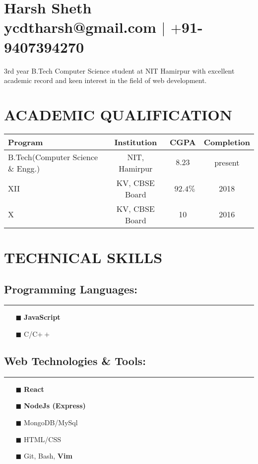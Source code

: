 \documentclass[12pt]{article}
\begin{document}
\section{Harsh Sheth\\ ycdtharsh@gmail.com $|$ $+$91-9407394270}
\par{3rd year B.Tech Computer Science student at NIT Hamirpur with excellent academic record and keen interest in the field of web development.}

\section{ACADEMIC QUALIFICATION}
\begin{tabular}{|l|c|c|c|}
  \hline
  Program & Institution & CGPA & Completion \\
  \hline
  B.Tech(Computer Science \& Engg.) & NIT, Hamirpur & $8.23$ & present\\
  XII & KV, CBSE Board & \ $92.4\%$ & 2018\\
  X & KV, CBSE Board & 10 & 2016\\
  \hline
\end{tabular}

\section{TECHNICAL SKILLS}
\vspace{-1em}
\begin{multicols}{2}
\subsection*{Programming Languages: }
\hrule
\vspace{1em}
\begin{itemize}
  \item[$\blacksquare$]{\textbf{JavaScript}}
  \item[$\blacksquare$]{C/C$++$}
  \item[]{}
  \item[]{}
\end{itemize}
\columnbreak
\subsection*{Web Technologies \& Tools: }
\hrule
\vspace{1em}
\begin{itemize}
  \item[$\blacksquare$]{\textbf{React}}
  \item[$\blacksquare$]{\textbf{NodeJs (Express)}}
  \item[$\blacksquare$]{MongoDB/MySql}
  \item[$\blacksquare$]{HTML/CSS}
  \item[$\blacksquare$]{Git, Bash, \textbf{Vim}}
\end{itemize}
\end{multicols}
\end{document}
